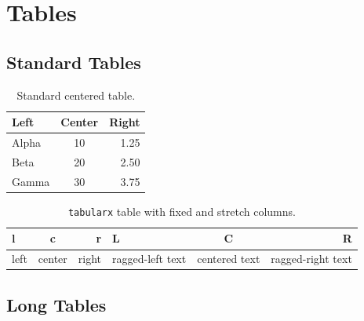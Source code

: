 \chapter{Tables}
\label{ch:tables}

\section{Standard Tables}
\label{sec:tables-standard}

\begin{table}[htbp]
	\centering
	\caption{Standard centered table.}
	\label{tab:tables-standard}
	\begin{tabular}{l c r}
		\hline
		\textbf{Left} & \textbf{Center} & \textbf{Right} \\
		\hline
		Alpha & 10 & 1.25 \\
		Beta & 20 & 2.50 \\
		Gamma & 30 & 3.75 \\
		\hline
	\end{tabular}
\end{table}

\begin{table}[htbp]
	\centering
	\caption{\texttt{tabularx} table with fixed and stretch columns.}
	\label{tab:tables-tabularx}
	\begin{tabularx}{\textwidth}{| l | c | r | L | C | R |}
		\hline
		\textbf{l} & \textbf{c} & \textbf{r} & \textbf{L} & \textbf{C} & \textbf{R} \\
		\hline
		left & center & right & ragged-left text & centered text & ragged-right text \\
		\hline
	\end{tabularx}
\end{table}

\section{Long Tables}
\label{sec:tables-long}

